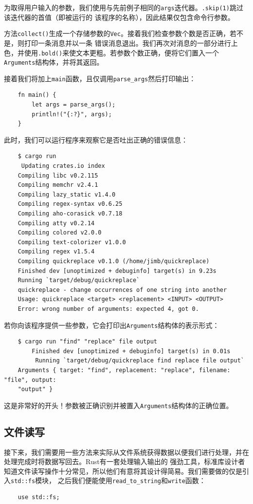 \smallskip
为取得用户输入的参数，我们使用与先前例子相同的\texttt{args}迭代器。\texttt{.skip(1)}跳过该迭代器的首值（即被运行的
该程序的名称），因此结果仅包含命令行参数。

\medskip
方法\texttt{collect()}生成一个存储参数的\texttt{Vec}。接着我们检查参数个数是否正确，若不是，则打印一条消息并以一条
错误消息退出。我们再次对消息的一部分进行上色，并使用\texttt{.bold()}来使文本更粗。若参数个数正确，便将它们置入一个
\texttt{Arguments}结构体，并将其返回。

\medskip
接着我们将加上\texttt{main}函数，且仅调用\texttt{parse\_args}然后打印输出：
\begin{verbatim}
    fn main() {
        let args = parse_args();
        println!("{:?}", args);
    }
\end{verbatim}

\smallskip
此时，我们可以运行程序来观察它是否吐出正确的错误信息：
\begin{verbatim}
    $ cargo run
     Updating crates.io index
    Compiling libc v0.2.115
    Compiling memchr v2.4.1
    Compiling lazy_static v1.4.0
    Compiling regex-syntax v0.6.25
    Compiling aho-corasick v0.7.18
    Compiling atty v0.2.14
    Compiling colored v2.0.0
    Compiling text-colorizer v1.0.0
    Compiling regex v1.5.4
    Compiling quickreplace v0.1.0 (/home/jimb/quickreplace)
    Finished dev [unoptimized + debuginfo] target(s) in 9.23s
    Running `target/debug/quickreplace`
    quickreplace - change occurrences of one string into another
    Usage: quickreplace <target> <replacement> <INPUT> <OUTPUT>
    Error: wrong number of arguments: expected 4, got 0.
\end{verbatim}

\smallskip
若你向该程序提供一些参数，它会打印出\texttt{Arguments}结构体的表示形式：
\begin{verbatim}
    $ cargo run "find" "replace" file output
        Finished dev [unoptimized + debuginfo] target(s) in 0.01s
         Running `target/debug/quickreplace find replace file output`
    Arguments { target: "find", replacement: "replace", filename: "file", output: 
    "output" }
\end{verbatim}

\smallskip
这是非常好的开头！参数被正确识别并被置入\texttt{Arguments}结构体的正确位置。

\medskip
\subsection{文件读写}
接下来，我们需要用一些方法来实际从文件系统获得数据以便我们进行处理，并在处理完成时将数据写回去。Rust有一套处理输入输出的
强劲工具，标准库设计者知道文件读写操作十分常见，所以他们有意将其设计得简易。我们需要做的仅是引入\texttt{std::fs}模块，
之后我们便能使用\texttt{read\_to\_string}和\texttt{write}函数：
\begin{verbatim}
    use std::fs;
\end{verbatim}

